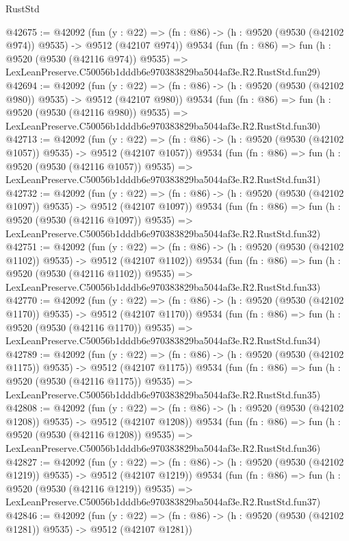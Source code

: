 \begin{lexlean}{RustStd}
\begin{coremodule}
@42675 := @42092
    (fun (y : @22) => (fn : @86) -> (h : @9520 (@9530 (@42102 @974)) @9535) -> @9512 (@42107 @974))
    @9534
    (fun (fn : @86) =>
    fun (h : @9520 (@9530 (@42116 @974)) @9535) =>
    LexLeanPreserve.C50056b1dddb6e970383829ba5044af3e.R2.RustStd.fun29)
@42694 := @42092
    (fun (y : @22) => (fn : @86) -> (h : @9520 (@9530 (@42102 @980)) @9535) -> @9512 (@42107 @980))
    @9534
    (fun (fn : @86) =>
    fun (h : @9520 (@9530 (@42116 @980)) @9535) =>
    LexLeanPreserve.C50056b1dddb6e970383829ba5044af3e.R2.RustStd.fun30)
@42713 := @42092
    (fun (y : @22) =>
    (fn : @86) -> (h : @9520 (@9530 (@42102 @1057)) @9535) -> @9512 (@42107 @1057))
    @9534
    (fun (fn : @86) =>
    fun (h : @9520 (@9530 (@42116 @1057)) @9535) =>
    LexLeanPreserve.C50056b1dddb6e970383829ba5044af3e.R2.RustStd.fun31)
@42732 := @42092
    (fun (y : @22) =>
    (fn : @86) -> (h : @9520 (@9530 (@42102 @1097)) @9535) -> @9512 (@42107 @1097))
    @9534
    (fun (fn : @86) =>
    fun (h : @9520 (@9530 (@42116 @1097)) @9535) =>
    LexLeanPreserve.C50056b1dddb6e970383829ba5044af3e.R2.RustStd.fun32)
@42751 := @42092
    (fun (y : @22) =>
    (fn : @86) -> (h : @9520 (@9530 (@42102 @1102)) @9535) -> @9512 (@42107 @1102))
    @9534
    (fun (fn : @86) =>
    fun (h : @9520 (@9530 (@42116 @1102)) @9535) =>
    LexLeanPreserve.C50056b1dddb6e970383829ba5044af3e.R2.RustStd.fun33)
@42770 := @42092
    (fun (y : @22) =>
    (fn : @86) -> (h : @9520 (@9530 (@42102 @1170)) @9535) -> @9512 (@42107 @1170))
    @9534
    (fun (fn : @86) =>
    fun (h : @9520 (@9530 (@42116 @1170)) @9535) =>
    LexLeanPreserve.C50056b1dddb6e970383829ba5044af3e.R2.RustStd.fun34)
@42789 := @42092
    (fun (y : @22) =>
    (fn : @86) -> (h : @9520 (@9530 (@42102 @1175)) @9535) -> @9512 (@42107 @1175))
    @9534
    (fun (fn : @86) =>
    fun (h : @9520 (@9530 (@42116 @1175)) @9535) =>
    LexLeanPreserve.C50056b1dddb6e970383829ba5044af3e.R2.RustStd.fun35)
@42808 := @42092
    (fun (y : @22) =>
    (fn : @86) -> (h : @9520 (@9530 (@42102 @1208)) @9535) -> @9512 (@42107 @1208))
    @9534
    (fun (fn : @86) =>
    fun (h : @9520 (@9530 (@42116 @1208)) @9535) =>
    LexLeanPreserve.C50056b1dddb6e970383829ba5044af3e.R2.RustStd.fun36)
@42827 := @42092
    (fun (y : @22) =>
    (fn : @86) -> (h : @9520 (@9530 (@42102 @1219)) @9535) -> @9512 (@42107 @1219))
    @9534
    (fun (fn : @86) =>
    fun (h : @9520 (@9530 (@42116 @1219)) @9535) =>
    LexLeanPreserve.C50056b1dddb6e970383829ba5044af3e.R2.RustStd.fun37)
@42846 := @42092
    (fun (y : @22) =>
    (fn : @86) -> (h : @9520 (@9530 (@42102 @1281)) @9535) -> @9512 (@42107 @1281))

\end{coremodule}
\end{lexlean}
